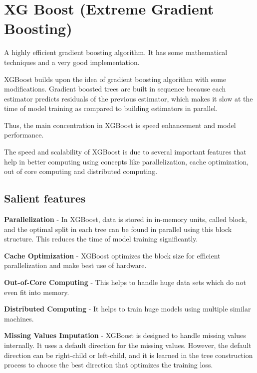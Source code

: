 	\section{XG Boost (Extreme Gradient Boosting)}
A highly efficient gradient boosting algorithm.  It has some mathematical techniques and a very good implementation.

	\begin{bulletedlist}
		\item XGBoost builds upon the idea of gradient boosting algorithm with some modifications. Gradient boosted trees are built in sequence because each estimator predicts residuals of the previous estimator, which makes it slow at the time of model training as compared to building estimators in parallel.
		\item Thus, the main concentration in XGBoost is speed enhancement and model performance.
		\item The speed and scalability of XGBoost is due to several important features that help in better computing using concepts like parallelization, cache optimization, out of core computing and
distributed computing.
	\end{bulletedlist}

	\subsection{Salient features}
	\begin{bulletedlist}
		\item \textbf{Parallelization} - In XGBoost, data is stored in in-memory units, called block, and the optimal split in each tree can be found in parallel using this block structure.  This reduces the time of model training significantly.
		\item \textbf{Cache Optimization} - XGBoost optimizes the block size for efficient parallelization and make best use of hardware.
		\item \textbf{Out-of-Core Computing} - This helps to handle huge data sets which do not even fit into memory.
		\item \textbf{Distributed Computing} - It helps to train huge models using multiple similar machines.
		\item \textbf{Missing Values Imputation} - XGBoost is designed to handle missing values internally.  It uses a default direction for the missing values. However, the default
direction can be right-child or left-child, and it is learned in the tree construction process to choose the best direction that optimizes the training loss.
	\end{bulletedlist}